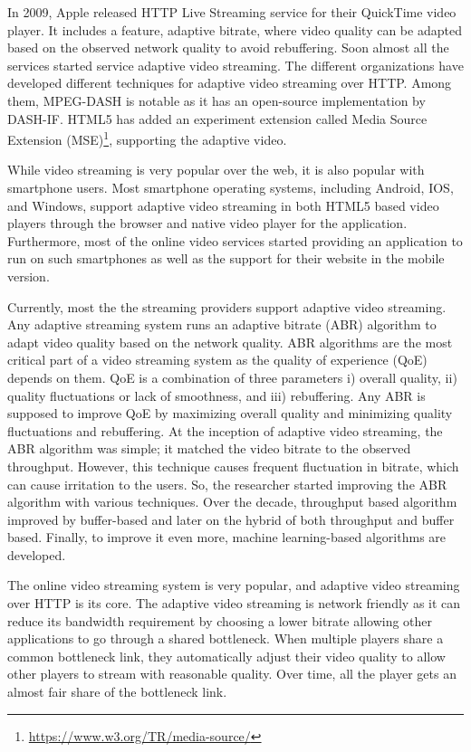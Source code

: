 In 2009, Apple released HTTP Live Streaming service for their QuickTime video player. It includes a feature, adaptive bitrate, where video quality can be adapted based on the observed network quality to avoid rebuffering. Soon almost all the services started service adaptive video streaming. The different organizations have developed different techniques for adaptive video streaming over HTTP. Among them, MPEG-DASH\cite{ISO/IEC23009-1:2019} is notable as it has an open-source implementation by DASH-IF. HTML5 has added an experiment extension called Media Source Extension (MSE)\footnote{\url{https://www.w3.org/TR/media-source/}}, supporting the adaptive video.

While video streaming is very popular over the web, it is also popular with smartphone users. Most smartphone operating systems, including Android, IOS, and Windows, support adaptive video streaming in both HTML5 based video players through the browser and native video player for the application. Furthermore, most of the online video services started providing an application to run on such smartphones as well as the support for their website in the mobile version.

Currently, most the the streaming providers support adaptive video streaming. Any adaptive streaming system runs an adaptive bitrate (ABR) algorithm to adapt video quality based on the network quality. ABR algorithms are the most critical part of a video streaming system as the quality of experience (QoE) depends on them. QoE is a combination of three parameters\cite{yin2015control} i) overall quality, ii) quality fluctuations or lack of smoothness, and iii) rebuffering. Any ABR is supposed to improve QoE by maximizing overall quality and minimizing quality fluctuations and rebuffering. At the inception of adaptive video streaming, the ABR algorithm was simple; it matched the video bitrate to the observed throughput\cite{5677508,10.1145/1943552.1943575,10.1145/1943552.1943574}. However, this technique causes frequent fluctuation in bitrate, which can cause irritation to the users. So, the researcher started improving the ABR algorithm with various techniques. Over the decade, throughput based algorithm improved by buffer-based\cite{Spiteri2016,10.1145/2910017.2910596,7393865} and later on the hybrid of both throughput and buffer based\cite{7247436,140405,yin2015control,10.1145/2670518.2673877}. Finally, to improve it even more, machine learning-based\cite{mao2017neural,Akhtar2018,9155492} algorithms are developed.

The online video streaming system is very popular, and adaptive video streaming over HTTP is its core. The adaptive video streaming is network friendly as it can reduce its bandwidth requirement by choosing a lower bitrate allowing other applications to go through a shared bottleneck. When multiple players share a common bottleneck link, they automatically adjust their video quality to allow other players to stream with reasonable quality. Over time, all the player gets an almost fair share of the bottleneck link.

